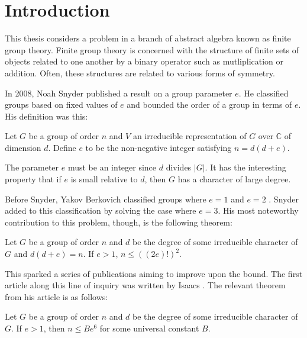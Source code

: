 \documentclass[main.tex]{subfiles}
\begin{document}
\chapter{Introduction}

This thesis considers a problem in a branch of abstract algebra known as finite group theory. Finite group theory is concerned with the structure of finite sets of objects related to one another by a binary operator such as mutliplication or addition. Often, these structures are related to various forms of symmetry.

\hss 

In 2008, Noah Snyder \cite{snyderarticle} published a result on a group parameter $e$. He classified groups based on fixed values of $e$ and bounded the order of a group in terms of $e$. His definition was this:

\hss

\begin{definition}
Let $G$ be a group of order $n$ and $V$ an irreducible representation of $G$ over $\mathbb{C}$ of dimension $d$. Define $e$ to be the non-negative integer satisfying $n = d(d + e)$.
\end{definition}

\hss

The parameter $e$ must be an integer since $d$ divides $|G|$. It has the interesting property that if $e$ is small relative to $d$, then $G$ has a character of large degree.

Before Snyder, Yakov Berkovich classified groups where $e=1$ and $e=2$ \cite{berkovicharticle}. Snyder added to this classification by solving the case where $e=3$. His most noteworthy contribution to this problem, though, is the following theorem:

\hss

\begin{theorem}
Let $G$ be a group of order $n$ and $d$ be the degree of some irreducible character of $G$ and $d(d+e) = n$. If $e > 1$, $n \le ((2e)!)^2$.
\end{theorem}

\hss

This sparked a series of publications aiming to improve upon the bound. The first article along this line of inquiry was written by Isaacs \cite{isaacsarticle}. The relevant theorem from his article is as follows:

\hss

\begin{theorem} Let $G$ be a group of order $n$ and $d$ be the degree of some irreducible character of $G$. If $e > 1$, then $n \le Be^6$ for some universal constant $B$.
\end{theorem}
\end{document}
